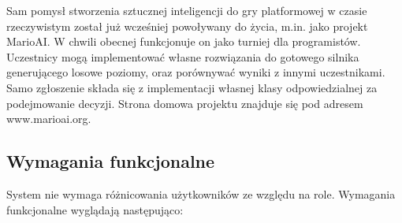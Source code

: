 \begin{par}
	Sam pomysł stworzenia sztucznej inteligencji do gry platformowej w czasie rzeczywistym został już wcześniej powoływany do życia, m.in. jako projekt MarioAI. 
	W chwili obecnej funkcjonuje on jako turniej dla programistów. 
	Uczestnicy mogą implementować własne rozwiązania do gotowego silnika generującego losowe poziomy, oraz porównywać wyniki z innymi uczestnikami.
	Samo zgłoszenie składa się z implementacji własnej klasy odpowiedzialnej za podejmowanie decyzji.
	Strona domowa projektu znajduje się pod adresem www.marioai.org.
\end{par}

\subsection{Wymagania funkcjonalne}
	System nie wymaga różnicowania użytkowników ze względu na role. Wymagania funkcjonalne wyglądają następująco:
